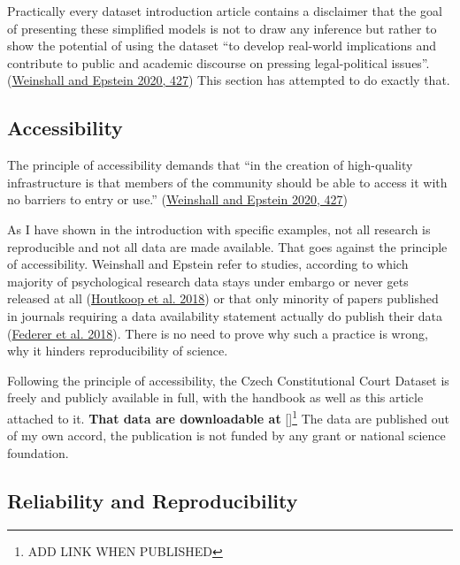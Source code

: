 \documentclass[
  11pt,
]{article}
\begin{document}
Practically every dataset introduction article contains a disclaimer
that the goal of presenting these simplified models is not to draw any
inference but rather to show the potential of using the dataset ``to
develop real-world implications and contribute to public and academic
discourse on pressing legal-political issues''.
(\protect\hyperlink{ref-weinshallDevelopingHighQualityData2020}{Weinshall
and Epstein 2020, 427}) This section has attempted to do exactly that.

\hypertarget{accessibility}{%
\subsection{Accessibility}\label{accessibility}}

The principle of accessibility demands that ``in the creation of
high-quality infrastructure is that members of the community should be
able to access it with no barriers to entry or use.''
(\protect\hyperlink{ref-weinshallDevelopingHighQualityData2020}{Weinshall
and Epstein 2020, 427})

As I have shown in the introduction with specific examples, not all
research is reproducible and not all data are made available. That goes
against the principle of accessibility. Weinshall and Epstein refer to
studies, according to which majority of psychological research data
stays under embargo or never gets released at all
(\protect\hyperlink{ref-houtkoopDataSharingPsychology2018}{Houtkoop et
al. 2018}) or that only minority of papers published in journals
requiring a data availability statement actually do publish their data
(\protect\hyperlink{ref-federerDataSharingPLOS2018}{Federer et al.
2018}). There is no need to prove why such a practice is wrong, why it
hinders reproducibility of science.

Following the principle of accessibility, the Czech Constitutional Court
Dataset is freely and publicly available in full, with the handbook as
well as this article attached to it. \textbf{That data are downloadable
at} {[}{]}\footnote{ADD LINK WHEN PUBLISHED} The data are published out
of my own accord, the publication is not funded by any grant or national
science foundation.

\hypertarget{reliability-and-reproducibility}{%
\subsection{Reliability and
Reproducibility}\label{reliability-and-reproducibility}}
\end{document}
